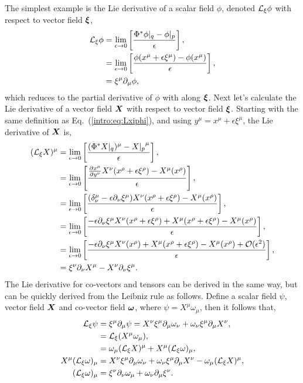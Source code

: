 The simplest example is the Lie derivative of a scalar field $\phi$, denoted $\mathcal{L}_\xi \phi$ with respect to vector field $\boldsymbol \xi$,
\begin{align} \label{intro:eq:Lxiphi}
\mathcal{L}_\xi \phi &= \lim_{\epsilon \rightarrow 0}\left[\frac{\Phi^*\phi\vert_q - \phi\vert_p}{\epsilon} \right] , \\
&= \lim_{\epsilon \rightarrow 0}\left[\frac{\phi(x^\mu + \epsilon \xi^\mu) - \phi(x^\mu)}{\epsilon} \right] , \\
&= \xi^\mu \partial_\mu \phi,
\end{align}
which reduces to the partial derivative of $\phi$ with along $\boldsymbol{\xi}$. Next let's calculate the Lie derivative of a vector field $\boldsymbol{X}$ with respect to vector field $\boldsymbol\xi$. Starting with the same definition as Eq.~(\ref{intro:eq:Lxiphi}), and using $y^\mu = x^\mu + \epsilon \xi^\mu$, the Lie derivative of $\boldsymbol X$ is,
\begin{align}
(\mathcal{L}_\xi {X})^\mu &= \lim_{\epsilon \rightarrow 0}\left[\frac{(\Phi^*X\vert_q)^\mu - {X\vert_p}^\mu}{\epsilon} \right] , \\
&= \lim_{\epsilon \rightarrow 0}\left[\frac{ \frac{\partial x^\mu}{\partial y^\nu}X^\nu(x^\rho + \epsilon \xi^\rho) - X^\mu(x^\rho)}{\epsilon} \right] , \\
&= \lim_{\epsilon \rightarrow 0}\left[\frac{ (\delta_\nu^\mu - \epsilon \partial_\nu \xi^\mu)X^\nu(x^\rho + \epsilon \xi^\rho) - X^\mu(x^\rho)}{\epsilon} \right] , \\
&= \lim_{\epsilon \rightarrow 0}\left[\frac{ - \epsilon \partial_\nu \xi^\mu X^\nu(x^\rho + \epsilon \xi^\rho)+ X^\mu(x^\rho + \epsilon \xi^\rho) - X^\mu(x^\rho)}{\epsilon}  \right] , \\
&= \lim_{\epsilon \rightarrow 0}\left[\frac{ - \epsilon \partial_\nu \xi^\mu X^\nu(x^\rho)+ X^\mu(x^\rho + \epsilon \xi^\rho) - X^\mu(x^\rho)+\mathcal{O}(\epsilon^2)}{\epsilon}  \right] , \\
&= \xi^\nu \partial_\nu X^\mu - X^\nu \partial_\nu \xi^\mu.
\end{align}
The Lie derivative for co-vectors and tensors can be derived in the same way, but can be quickly derived from the Leibniz rule as follows. Define a scalar field $\psi$, vector field $\boldsymbol{X}$ and co-vector field $\boldsymbol\omega$, where $\psi = X^\mu \omega_\mu$, then it follows that,
\begin{align}
\mathcal{L}_\xi \psi &= \xi^\mu \partial_\mu \psi =  X^\nu\xi^\mu\partial_\mu\omega_\nu+\omega_\nu\xi^\mu\partial_\mu X^\nu, \\
              &= \mathcal{L}_\xi (X^\mu \omega_\mu),\\
              &= \omega_\mu (\mathcal{L}_\xi X)^\mu + X^\mu(\mathcal{L}_\xi\omega)_\mu,\\
               X^\mu(\mathcal{L}_\xi \omega)_\mu & =X^\nu\xi^\mu\partial_\mu\omega_\nu+\omega_\nu\xi^\mu\partial_\mu X^\nu-\omega_\mu (\mathcal{L}_\xi X)^\mu, \\
               (\mathcal{L}_\xi \omega)_\mu&= \xi^\nu \partial_\nu \omega_\mu + \omega_\nu \partial_\mu \xi^\nu.
\end{align}
